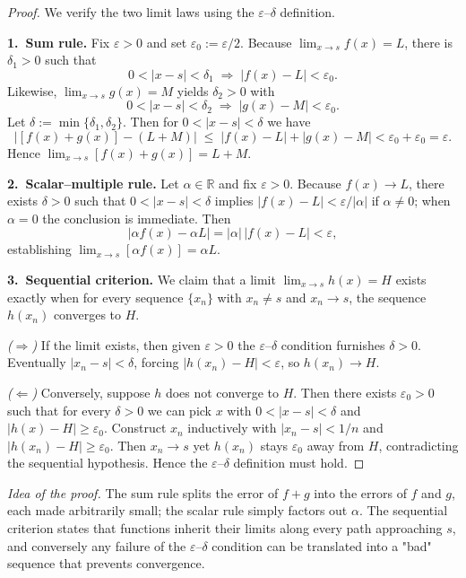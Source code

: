 \documentclass[10pt]{extarticle}
\begin{document}
\begin{proof}
    We verify the two limit laws using the $\varepsilon$--$\delta$ definition.

    \medskip
    \textbf{1.~Sum rule.}  Fix $\varepsilon>0$ and set $\varepsilon_{0}:=\varepsilon/2$.  Because $\lim_{x\to s} f(x)=L$, there is $\delta_{1}>0$ such that
    \[
        0<|x-s|<\delta_{1}\;\Longrightarrow\;|f(x)-L|<\varepsilon_{0}.
    \]
    Likewise, $\lim_{x\to s} g(x)=M$ yields $\delta_{2}>0$ with
    \[
        0<|x-s|<\delta_{2}\;\Longrightarrow\;|g(x)-M|<\varepsilon_{0}.
    \]
    Let $\delta:=\min\{\delta_{1},\delta_{2}\}$.  Then for $0<|x-s|<\delta$ we have
    \[
        |[f(x)+g(x)]-(L+M)|\;\le\;|f(x)-L|+|g(x)-M|<\varepsilon_{0}+\varepsilon_{0}=\varepsilon.
    \]
    Hence $\lim_{x\to s}[f(x)+g(x)]=L+M$.

    \medskip
    \textbf{2.~Scalar--multiple rule.}  Let $\alpha\in\mathbb R$ and fix $\varepsilon>0$.  Because $f(x)\to L$, there exists $\delta>0$ such that $0<|x-s|<\delta$ implies $|f(x)-L|<\varepsilon/|\alpha|$ if $\alpha\neq0$; when $\alpha=0$ the conclusion is immediate.  Then
    \[
        |\alpha f(x)-\alpha L|=|\alpha|\,|f(x)-L|<\varepsilon,
    \]
    establishing $\lim_{x\to s}[\alpha f(x)]=\alpha L$.

    \medskip
    \textbf{3.~Sequential criterion.}  We claim that a limit $\lim_{x\to s} h(x)=H$ exists exactly when for every sequence $\{x_{n}\}$ with $x_{n}\neq s$ and $x_{n}\to s$, the sequence $h(x_{n})$ converges to $H$.

    \emph{($\Rightarrow$)}  If the limit exists, then given $\varepsilon>0$ the $\varepsilon$--$\delta$ condition furnishes $\delta>0$.  Eventually $|x_{n}-s|<\delta$, forcing $|h(x_{n})-H|<\varepsilon$, so $h(x_{n})\to H$.

    \emph{($\Leftarrow$)}  Conversely, suppose $h$ does not converge to $H$.  Then there exists $\varepsilon_{0}>0$ such that for every $\delta>0$ we can pick $x$ with $0<|x-s|<\delta$ and $|h(x)-H|\ge\varepsilon_{0}$.  Construct $x_{n}$ inductively with $|x_{n}-s|<1/n$ and $|h(x_{n})-H|\ge\varepsilon_{0}$.  Then $x_{n}\to s$ yet $h(x_{n})$ stays $\varepsilon_{0}$ away from $H$, contradicting the sequential hypothesis.  Hence the $\varepsilon$--$\delta$ definition must hold.
\end{proof}

\begin{remark}
    \emph{Idea of the proof.}  The sum rule splits the error of $f+g$ into the errors of $f$ and $g$, each made arbitrarily small; the scalar rule simply factors out $\alpha$.  The sequential criterion states that functions inherit their limits along every path approaching $s$, and conversely any failure of the $\varepsilon$--$\delta$ condition can be translated into a "bad" sequence that prevents convergence.
\end{remark}
\end{document}
